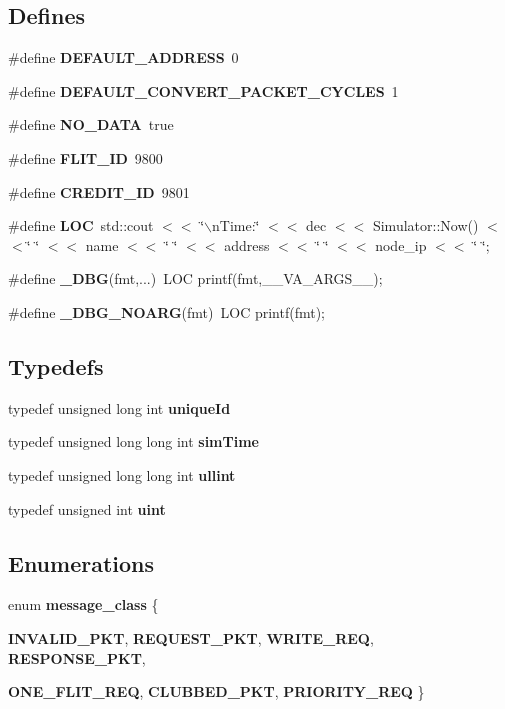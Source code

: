 \subsection*{Defines}
\begin{CompactItemize}
\item 
\#define {\bf DEFAULT\_\-ADDRESS}~0
\item 
\#define {\bf DEFAULT\_\-CONVERT\_\-PACKET\_\-CYCLES}~1
\item 
\#define {\bf NO\_\-DATA}~true
\item 
\#define {\bf FLIT\_\-ID}~9800
\item 
\#define {\bf CREDIT\_\-ID}~9801
\item 
\#define {\bf LOC}~std::cout $<$$<$ \char`\"{}$\backslash$nTime:\char`\"{} $<$$<$ dec $<$$<$ Simulator::Now() $<$$<$\char`\"{} \char`\"{} $<$$<$ name $<$$<$ \char`\"{} \char`\"{} $<$$<$ address $<$$<$ \char`\"{} \char`\"{} $<$$<$ node\_\-ip $<$$<$ \char`\"{} \char`\"{};
\item 
\#define {\bf \_\-DBG}(fmt,...)~LOC printf(fmt,\_\-\_\-VA\_\-ARGS\_\-\_\-);
\item 
\#define {\bf \_\-DBG\_\-NOARG}(fmt)~LOC printf(fmt);
\end{CompactItemize}
\subsection*{Typedefs}
\begin{CompactItemize}
\item 
typedef unsigned long int {\bf uniqueId}
\item 
typedef unsigned long long int {\bf simTime}
\item 
typedef unsigned long long int {\bf ullint}
\item 
typedef unsigned int {\bf uint}
\end{CompactItemize}
\subsection*{Enumerations}
\begin{CompactItemize}
\item 
enum {\bf message\_\-class} \{ \par
{\bf INVALID\_\-PKT}, 
{\bf REQUEST\_\-PKT}, 
{\bf WRITE\_\-REQ}, 
{\bf RESPONSE\_\-PKT}, 
\par
{\bf ONE\_\-FLIT\_\-REQ}, 
{\bf CLUBBED\_\-PKT}, 
{\bf PRIORITY\_\-REQ}
 \}
\end{CompactItemize}
